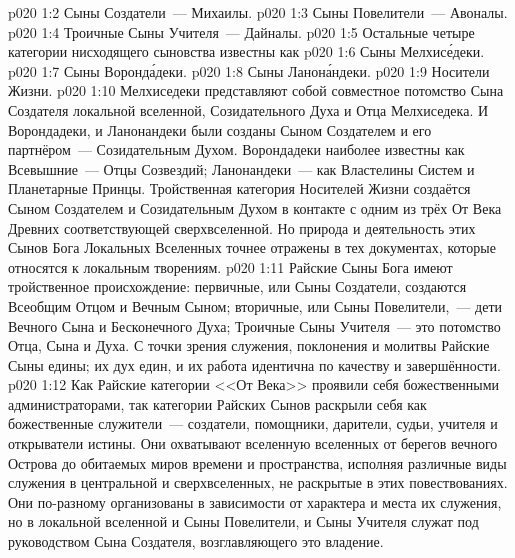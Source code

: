 \vs p020 1:2 Сыны Создатели~--- Михаилы.
\vs p020 1:3 Сыны Повелители~--- Авоналы.
\vs p020 1:4 Троичные Сыны Учителя~--- Дайналы.
\vs p020 1:5 \pc Остальные четыре категории нисходящего сыновства известны как 
\vs p020 1:6 Сыны Мелхис\'едеки.
\vs p020 1:7 Сыны Воронд\'адеки.
\vs p020 1:8 Сыны Ланон\'андеки.
\vs p020 1:9 Носители Жизни.
\vs p020 1:10 \pc Мелхиседеки представляют собой совместное потомство Сына Создателя локальной вселенной, Созидательного Духа и Отца Мелхиседека. И Ворондадеки, и Ланонандеки были созданы Сыном Создателем и его партнёром~--- Созидательным Духом. Ворондадеки наиболее известны как Всевышние~--- Отцы Созвездий; Ланонандеки~--- как Властелины Систем и Планетарные Принцы. Тройственная категория Носителей Жизни создаётся Сыном Создателем и Созидательным Духом в контакте с одним из трёх От Века Древних соответствующей сверхвселенной. Но природа и деятельность этих Сынов Бога Локальных Вселенных точнее отражены в тех документах, которые относятся к локальным творениям.
\vs p020 1:11 \pc Райские Сыны Бога имеют тройственное происхождение: первичные, или Сыны Создатели, создаются Всеобщим Отцом и Вечным Сыном; вторичные, или Сыны Повелители,~--- дети Вечного Сына и Бесконечного Духа; Троичные Сыны Учителя~--- это потомство Отца, Сына и Духа. С точки зрения служения, поклонения и молитвы Райские Сыны едины; их дух един, и их работа идентична по качеству и завершённости.
\vs p020 1:12 Как Райские категории <<От Века>> проявили себя божественными администраторами, так категории Райских Сынов раскрыли себя как божественные служители~--- создатели, помощники, дарители, судьи, учителя и открыватели истины. Они охватывают вселенную вселенных от берегов вечного Острова до обитаемых миров времени и пространства, исполняя различные виды служения в центральной и сверхвселенных, не раскрытые в этих повествованиях. Они по\hyp{}разному организованы в зависимости от характера и места их служения, но в локальной вселенной и Сыны Повелители, и Сыны Учителя служат под руководством Сына Создателя, возглавляющего это владение.
